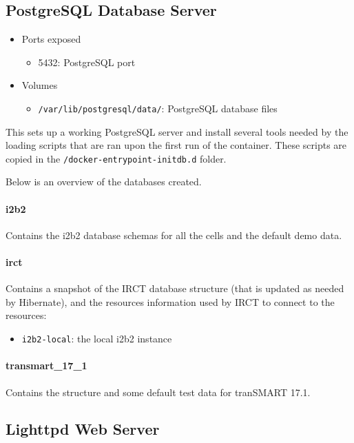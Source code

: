 \subsection{PostgreSQL Database Server}

\begin{itemize}
    \item Ports exposed
        \begin{itemize}
        \item 5432: PostgreSQL port
        \end{itemize}
        
    \item Volumes
        \begin{itemize}
        \item \verb|/var/lib/postgresql/data/|: PostgreSQL database files
        \end{itemize}
\end{itemize}

This sets up a working PostgreSQL server and install several tools needed by the loading scripts that are ran upon the first run of the container.
These scripts are copied in the \verb|/docker-entrypoint-initdb.d| folder.

Below is an overview of the databases created.

\paragraph{i2b2}
Contains the i2b2 database schemas for all the cells and the default demo data.

\paragraph{irct}
Contains a snapshot of the IRCT database structure (that is updated as needed by Hibernate), and the resources information used by IRCT to connect to the resources:

\begin{itemize}
    \item \verb|i2b2-local|: the local i2b2 instance
\end{itemize}

\paragraph{transmart\_17\_1}
Contains the structure and some default test data for tranSMART 17.1.
    
\subsection{Lighttpd Web Server}

